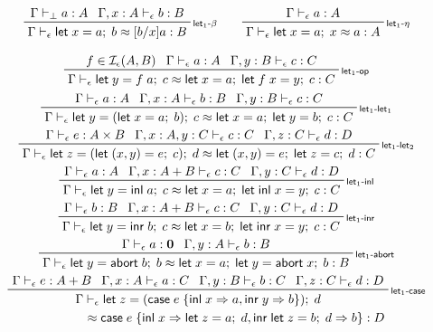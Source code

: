 \documentclass[acmsmall,screen,review]{acmart}
\newcommand{\mc}[1]{\ensuremath{\mathcal{#1}}}
\newcommand{\mb}[1]{\ensuremath{\mathbf{#1}}}
\newcommand{\ms}[1]{\ensuremath{\mathsf{#1}}}
\newcommand{\lto}{\Rightarrow}
\newcommand{\linl}[1]{\ms{inl}\;{#1}}
\newcommand{\linr}[1]{\ms{inr}\;{#1}}
\newcommand{\labort}[1]{\ms{abort}\;{#1}}
\newcommand{\letexpr}[3]{\ensuremath{\ms{let}\;#1 = #2;\;#3}}
\newcommand{\caseexpr}[5]{\ms{case}\;#1\;\{\linl{#2} \lto #3, \linr{#4} \lto #5\}}
\newcommand{\bhyp}[2]{#1 : #2}
\newcommand{\rle}[1]{{\scriptsize\textsf{#1}}}
\newcommand{\hasty}[4]{#1 \vdash_{#2} #3: {#4}}
\newcommand{\isop}[4]{#1 \in \mc{I}_{#4}(#2, #3)}
\newcommand{\teqv}{\approx}
\newcommand{\tmeq}[5]{#1 \vdash_{#2} #3 \teqv #4 : {#5}}
\begin{document}
\begin{gather*}
  \prftree[r]{\rle{let$_1$-$\beta$}}
    {\hasty{\Gamma}{\bot}{a}{A}}
    {\hasty{\Gamma, \bhyp{x}{A}}{\epsilon}{b}{B}}
    {\tmeq{\Gamma}{\epsilon}{\letexpr{x}{a}{b}}{[b/x]a}{B}}
  \qquad
  \prftree[r]{\rle{let$_1$-$\eta$}}
    {\hasty{\Gamma}{\epsilon}{a}{A}}
    {\tmeq{\Gamma}{\epsilon}{\letexpr{x}{a}{x}}{a}{A}}
\end{gather*}

\begin{gather*}
  \prftree[r]{\rle{let$_1$-op}}
    {\isop{f}{A}{B}{\epsilon}}
    {\hasty{\Gamma}{\epsilon}{a}{A}}
    {\hasty{\Gamma, \bhyp{y}{B}}{\epsilon}{c}{C}}
    {\tmeq{\Gamma}{\epsilon}{\letexpr{y}{f\;a}{c}}{\letexpr{x}{a}{\letexpr{f\;x}{y}{c}}}{C}}
  \\
  \prftree[r]{\rle{let$_1$-let$_1$}}
    {\hasty{\Gamma}{\epsilon}{a}{A}}
    {\hasty{\Gamma, \bhyp{x}{A}}{\epsilon}{b}{B}}
    {\hasty{\Gamma, \bhyp{y}{B}}{\epsilon}{c}{C}}
    {\tmeq{\Gamma}{\epsilon}
      {\letexpr{y}{(\letexpr{x}{a}{b})}{c}}
      {\letexpr{x}{a}{\letexpr{y}{b}{c}}}{C}}
  \\
  \prftree[r]{\rle{let$_1$-let$_2$}}
    {\hasty{\Gamma}{\epsilon}{e}{A \times B}}
    {\hasty{\Gamma, \bhyp{x}{A}, \bhyp{y}{C}}{\epsilon}{c}{C}}
    {\hasty{\Gamma, \bhyp{z}{C}}{\epsilon}{d}{D}}
    {\tmeq{\Gamma}{\epsilon}
      {\letexpr{z}{(\letexpr{(x, y)}{e}{c})}{d}}
      {\letexpr{(x, y)}{e}{\letexpr{z}{c}{d}}}{C}}
  \\
  \prftree[r]{\rle{let$_1$-inl}}
    {\hasty{\Gamma}{\epsilon}{a}{A}}
    {\hasty{\Gamma, \bhyp{x}{A + B}}{\epsilon}{c}{C}}
    {\hasty{\Gamma, \bhyp{y}{C}}{\epsilon}{d}{D}}
    {\tmeq{\Gamma}{\epsilon}{\letexpr{y}{\linl{a}}{c}}{\letexpr{x}{a}{\letexpr{\linl{x}}{y}{c}}}{C}}
  \\
  \prftree[r]{\rle{let$_1$-inr}}
    {\hasty{\Gamma}{\epsilon}{b}{B}}
    {\hasty{\Gamma, \bhyp{x}{A + B}}{\epsilon}{c}{C}}
    {\hasty{\Gamma, \bhyp{y}{C}}{\epsilon}{d}{D}}
    {\tmeq{\Gamma}{\epsilon}{\letexpr{y}{\linr{b}}{c}}{\letexpr{x}{b}{\letexpr{\linr{x}}{y}{c}}}{C}}
  \\
  \prftree[r]{\rle{let$_1$-abort}}
    {\hasty{\Gamma}{\epsilon}{a}{\mb{0}}}
    {\hasty{\Gamma, \bhyp{y}{A}}{\epsilon}{b}{B}}
    {\tmeq{\Gamma}{\epsilon}
      {\letexpr{y}{\labort{b}}{b}}
      {\letexpr{x}{a}{\letexpr{y}{\labort{x}}{b}}}{B}}
  \\
  \prftree[r]{\rle{let$_1$-case}}
    {\hasty{\Gamma}{\epsilon}{e}{A + B}}
    {\hasty{\Gamma, \bhyp{x}{A}}{\epsilon}{a}{C}}
    {\hasty{\Gamma, \bhyp{y}{B}}{\epsilon}{b}{C}}
    {\hasty{\Gamma, \bhyp{z}{C}}{\epsilon}{d}{D}}
    { 
      \prfStackPremises
      {\Gamma \vdash_\epsilon \letexpr{z}{(\caseexpr{e}{x}{a}{y}{b})}{d}}
      {\hspace{6em} \teqv \caseexpr{e}{x}{\letexpr{z}{a}{d}}{\letexpr{z}{b}{d}}{b} : D}
    }
\end{gather*}
\end{document}

